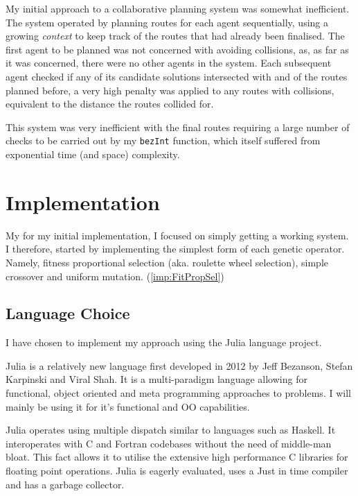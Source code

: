 My initial approach to a collaborative planning system was somewhat inefficient. The system operated by planning routes for each agent sequentially, using a growing \textit{context} to keep track of the routes that had already been finalised. The first agent to be planned was not concerned with avoiding collisions, as, as far as it was concerned, there were no other agents in the system. Each subsequent agent checked if any of its candidate solutions intersected with and of the routes planned before, a very high penalty was applied to any routes with collisions, equivalent to the distance  the routes collided for.

This system was very inefficient with the final routes requiring a large number of checks to be carried out by my \texttt{bezInt} function, which itself suffered from  exponential time (and space) complexity.

\section{Implementation} 
My for my initial implementation, I focused on simply getting a working system. I therefore, started by implementing the simplest form of each genetic operator. Namely, fitness proportional selection (aka. roulette wheel selection), simple crossover and uniform mutation. (\ref{imp:FitPropSel})


\subsection{Language Choice}

I have chosen to implement my approach using the Julia language project\cite{JuliaProgrammingLanguage}.

Julia is a relatively new language first developed in 2012 by Jeff Bezanson, Stefan Karpinski and Viral Shah. It is a multi-paradigm language allowing for functional, object oriented and meta programming approaches to problems. I will mainly be using it for it's functional and OO capabilities. 

Julia operates using multiple dispatch similar to languages such as Haskell. It interoperates with C and Fortran codebases without the need of middle-man bloat. This fact allows it to utilise the extensive high performance C libraries for floating point operations. Julia is eagerly evaluated, uses a Just in time compiler and has a garbage collector.


